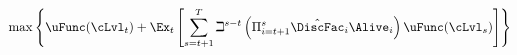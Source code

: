   \begin{equation}
    \max \left\{ \uFunc(\cLvl_{t})+\Ex_{t}\left[\sum_{s=t+1}^{T} {\beth}^{s-t}\left( \Pi _{i=t+1}^{s}\hat{\DiscFac}_{i} \Alive _{i}\right) \uFunc(\cLvl_{s}) \right]\right\}   \label{eq:lifecyclemax}
  \end{equation}
